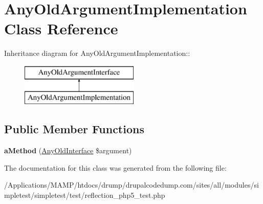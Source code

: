 \hypertarget{class_any_old_argument_implementation}{
\section{AnyOldArgumentImplementation Class Reference}
\label{class_any_old_argument_implementation}
}
Inheritance diagram for AnyOldArgumentImplementation::\begin{figure}[H]
\begin{center}
\leavevmode
\includegraphics[height=2cm]{class_any_old_argument_implementation}
\end{center}
\end{figure}
\subsection*{Public Member Functions}
\begin{DoxyCompactItemize}
\item 
\hypertarget{class_any_old_argument_implementation_a41f6b3f8981a00924449f2e460c3f4f1}{
{\bfseries aMethod} (\hyperlink{interface_any_old_interface}{AnyOldInterface} \$argument)}
\label{class_any_old_argument_implementation_a41f6b3f8981a00924449f2e460c3f4f1}

\end{DoxyCompactItemize}


The documentation for this class was generated from the following file:\begin{DoxyCompactItemize}
\item 
/Applications/MAMP/htdocs/drump/drupalcodedump.com/sites/all/modules/simpletest/simpletest/test/reflection\_\-php5\_\-test.php\end{DoxyCompactItemize}
